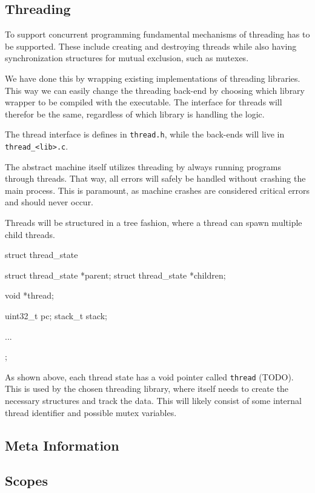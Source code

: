 \subsection{Threading}

To support concurrent programming fundamental mechanisms of threading has to be
supported. These include creating and destroying threads while also having
synchronization structures for mutual exclusion, such as mutexes.

We have done this by wrapping existing implementations of threading libraries.
This way we can easily change the threading back-end by choosing which library
wrapper to be compiled with the executable. The interface for threads will
therefor be the same, regardless of which library is handling the logic.

The thread interface is defines in {\tt thread.h}, while the back-ends will live
in {\tt thread\_<lib>.c}.

The abstract machine itself utilizes threading by always running programs
through threads. That way, all errors will safely be handled without crashing
the main process. This is paramount, as machine crashes are considered critical
errors and should never occur.

Threads will be structured in a tree fashion, where a thread can spawn multiple
child threads.
\begin{ccode}
struct thread_state {
    struct thread_state *parent;
    struct thread_state *children;

    void *thread;

    uint32_t pc;
    stack_t stack;

    ...
};
\end{ccode}

As shown above, each thread state has a void pointer called {\tt thread}
(TODO). This is used by the chosen threading library, where itself needs to
create the necessary structures and track the data. This will likely consist of
some internal thread identifier and possible mutex variables.

\subsection{Meta Information}
\label{sec:implementation:meta}


\subsection{Scopes}

